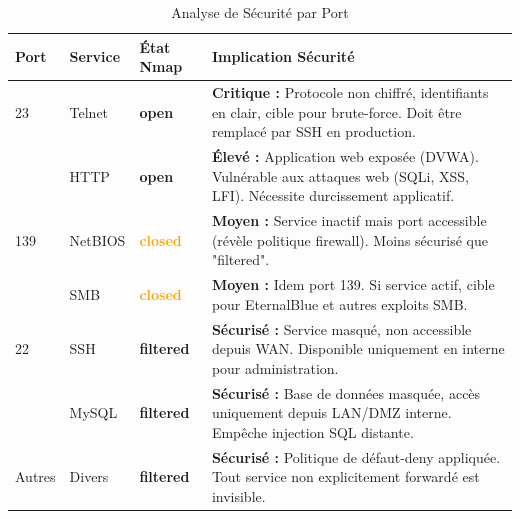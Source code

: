 \documentclass[12pt,a4paper,openany]{report}
\newcommand{\tableheadcolor}{\rowcolor{tableheadbg}}
\begin{document}
	\begin{table}[H]
		\centering
		\small
		\renewcommand{\arraystretch}{1.6}
		\setlength{\arrayrulewidth}{0.5pt}
		\begin{tabular}{>{\centering\arraybackslash}p{1.5cm} p{2.5cm} p{2.3cm} p{8cm}}
			\arrayrulecolor{tableborder}
			\hline
			\tableheadcolor
			\textcolor{tableheadfg}{\textbf{Port}} &
			\textcolor{tableheadfg}{\textbf{Service}} &
			\textcolor{tableheadfg}{\textbf{État Nmap}} &
			\textcolor{tableheadfg}{\textbf{Implication Sécurité}} \\
			\hline
			\rowcolor{tablerowalt}
			23 & Telnet & \textcolor{green!50!black}{\textbf{open}} & 
			\textbf{Critique :} Protocole non chiffré, identifiants en clair, cible pour brute-force. Doit être remplacé par SSH en production. \\
			
			80 & HTTP & \textcolor{green!50!black}{\textbf{open}} & 
			\textbf{Élevé :} Application web exposée (DVWA). Vulnérable aux attaques web (SQLi, XSS, LFI). Nécessite durcissement applicatif. \\
			
			\rowcolor{tablerowalt}
			139 & NetBIOS & \textcolor{orange}{\textbf{closed}} & 
			\textbf{Moyen :} Service inactif mais port accessible (révèle politique firewall). Moins sécurisé que "filtered". \\
			
			445 & SMB & \textcolor{orange}{\textbf{closed}} & 
			\textbf{Moyen :} Idem port 139. Si service actif, cible pour EternalBlue et autres exploits SMB. \\
			
			\rowcolor{tablerowalt}
			22 & SSH & \textcolor{accent}{\textbf{filtered}} & 
			\textbf{Sécurisé :} Service masqué, non accessible depuis WAN. Disponible uniquement en interne pour administration. \\
			
			3306 & MySQL & \textcolor{accent}{\textbf{filtered}} & 
			\textbf{Sécurisé :} Base de données masquée, accès uniquement depuis LAN/DMZ interne. Empêche injection SQL distante. \\
			
			\rowcolor{tablerowalt}
			Autres & Divers & \textcolor{accent}{\textbf{filtered}} & 
			\textbf{Sécurisé :} Politique de défaut-deny appliquée. Tout service non explicitement forwardé est invisible. \\
			\hline
		\end{tabular}
		\caption{Analyse de Sécurité par Port}
	\end{table}
	
\end{document}
